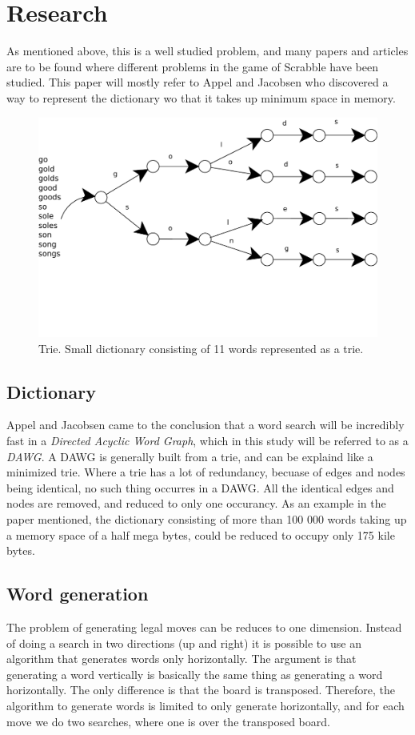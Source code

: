 \documentclass[a4paper, 12pt]{report}
\begin{document}
\section{Research}
As mentioned above, this is a well studied problem, and many papers and articles are to be found where different problems in the game of Scrabble have been studied. This paper will mostly refer to Appel and Jacobsen \cite{fastest} who discovered a way to represent the dictionary wo that it takes up minimum space in memory.
\begin{figure}[h]
\centering
\includegraphics[scale=0.5]{trie}
\caption{Trie. Small dictionary consisting of 11 words represented as a trie.}
\end{figure}
\subsection{Dictionary}
Appel and Jacobsen \cite{fastest} came to the conclusion that a word search will be incredibly fast in a \emph{Directed Acyclic Word Graph}, which in this study will be referred to as a \emph{DAWG}. A DAWG is generally built from a trie, and can be explaind like a minimized trie. Where a trie has a lot of redundancy, becuase of edges and nodes being identical, no such thing occurres in a DAWG. All the identical edges and nodes are removed, and reduced to only one occurancy. As an example in the paper mentioned, the dictionary consisting of more than 100 000 words taking up a memory space of a half mega bytes, could be reduced to occupy only 175 kile bytes.


\subsection{Word generation}
The problem of generating legal moves can be reduces to one dimension. Instead of doing a search in two directions (up and right) it is possible to use an algorithm that generates words only horizontally. The argument is that generating a word vertically is basically the same thing as generating a word horizontally. The only difference is that the board is transposed. Therefore, the algorithm to generate words is limited to only generate horizontally, and for each move we do two searches, where one is over the transposed board.
\end{document}
